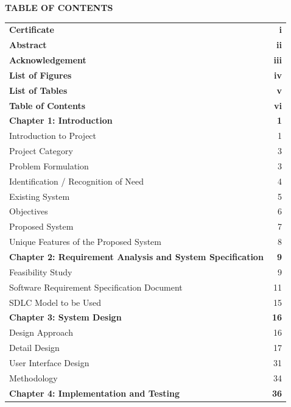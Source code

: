 \documentclass[12pt,a4paper]{report}
\begin{document}
\newpage
\begin{center}{\fontsize{16pt}{18pt}\selectfont\textbf{TABLE OF CONTENTS}}\end{center}
\vspace{0.5cm}
\renewcommand{\arraystretch}{1.4}
{\fontsize{12pt}{14pt}\selectfont
\begin{longtable}{@{} l @{\hspace{1cm}} r @{}}
\textbf{Certificate} & \textbf{i}\\
\textbf{Abstract} & \textbf{ii}\\
\textbf{Acknowledgement} & \textbf{iii}\\
\textbf{List of Figures} & \textbf{iv}\\
\textbf{List of Tables} & \textbf{v}\\
\textbf{Table of Contents} & \textbf{vi}\\
\addlinespace[0.3cm]
\textbf{Chapter 1: Introduction} & \textbf{1}\\
\quad 1.1\quad Introduction to Project & 1\\
\quad 1.2\quad Project Category & 3\\
\quad 1.3\quad Problem Formulation & 3\\
\quad 1.4\quad Identification / Recognition of Need & 4\\
\quad 1.5\quad Existing System & 5\\
\quad 1.6\quad Objectives & 6\\
\quad 1.7\quad Proposed System & 7\\
\quad 1.8\quad Unique Features of the Proposed System & 8\\
\addlinespace[0.3cm]
\textbf{Chapter 2: Requirement Analysis and System Specification} & \textbf{9}\\
\quad 2.1\quad Feasibility Study & 9\\
\quad 2.2\quad Software Requirement Specification Document & 11\\
\quad 2.3\quad SDLC Model to be Used & 15\\
\addlinespace[0.3cm]
\textbf{Chapter 3: System Design} & \textbf{16}\\
\quad 3.1\quad Design Approach & 16\\
\quad 3.2\quad Detail Design & 17\\
\quad 3.3\quad User Interface Design & 31\\
\quad 3.4\quad Methodology & 34\\
\addlinespace[0.3cm]
\textbf{Chapter 4: Implementation and Testing} & \textbf{36}\\

\end{longtable}}
\end{document}
